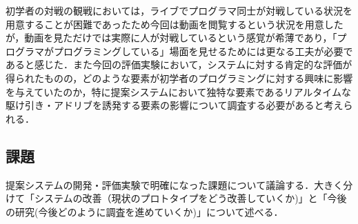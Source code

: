 初学者の対戦の観戦においては，ライブでプログラマ同士が対戦している状況を用意することが困難であったため今回は動画を閲覧するという状況を用意したが，動画を見ただけでは実際に人が対戦しているという感覚が希薄であり，「プログラマがプログラミングしている」場面を見せるためには更なる工夫が必要であると感じた．また今回の評価実験において，システムに対する肯定的な評価が得られたものの，どのような要素が初学者のプログラミングに対する興味に影響を与えていたのか，特に提案システムにおいて独特な要素であるリアルタイムな駆け引き・アドリブを誘発する要素の影響について調査する必要があると考えられる．

\subsection{課題}
提案システムの開発・評価実験で明確になった課題について議論する．大きく分けて「システムの改善（現状のプロトタイプをどう改善していくか)」と「今後の研究(今後どのように調査を進めていくか)」について述べる．

